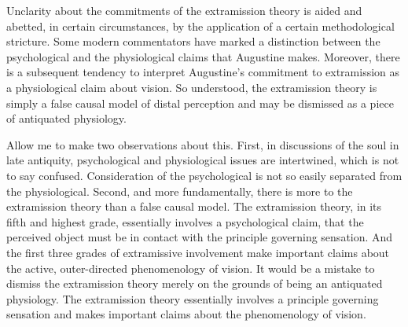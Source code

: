 \documentclass[12pt]{article}
\begin{document}
Unclarity about the commitments of the extramission theory is aided and abetted, in certain circumstances, by the application of a certain methodological stricture. Some modern commentators have marked a distinction between the psychological and the physiological claims that Augustine makes. Moreover, there is a subsequent tendency to interpret Augustine's commitment to extramission as a physiological claim about vision. So understood, the extramission theory is simply a false causal model of distal perception and may be dismissed as a piece of antiquated physiology.

Allow me to make two observations about this. First, in discussions of the soul in late antiquity, psychological and physiological issues are intertwined, which is not to say confused. Consideration of the psychological is not so easily separated from the physiological. Second, and more fundamentally, there is more to the extramission theory than a false causal model. The extramission theory, in its fifth and highest grade, essentially involves a psychological claim, that the perceived object must be in contact with the principle governing sensation. And the first three grades of extramissive involvement make important claims about the active, outer-directed phenomenology of vision. 
It would be a mistake to dismiss the extramission theory merely on the grounds of being an antiquated physiology. The extramission theory essentially involves a principle governing sensation and makes important claims about the phenomenology of vision.


\end{document}
